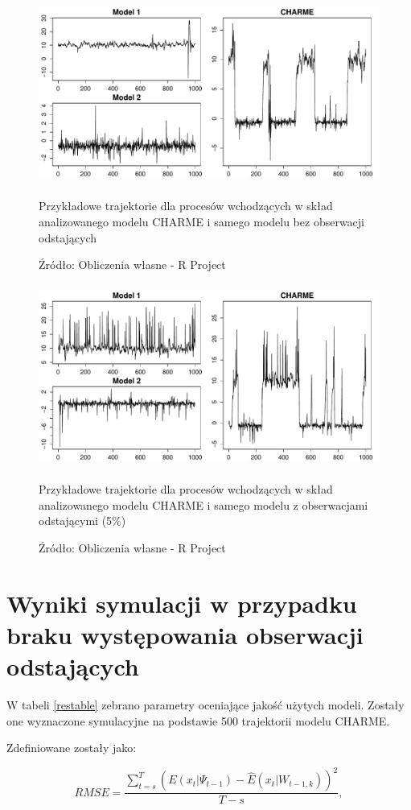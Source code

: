 \documentclass[man,mfu]{mgrwms}
\begin{document}
\begin{figure}[H]
\centering
\includegraphics[width=160mm,height = 60mm]{simex}
\caption{Przykładowe trajektorie dla procesów wchodzących w skład analizowanego modelu CHARME i samego modelu bez obserwacji odstających}
\caption*{Źródło: Obliczenia własne - R Project}
\label{fig:simex}
\end{figure}

\begin{figure}[H]
\centering
\includegraphics[width=160mm,height = 60mm]{simexout}
\caption{Przykładowe trajektorie dla procesów wchodzących w skład analizowanego modelu CHARME i samego modelu z obserwacjami odstającymi (5\%)}
\caption*{Źródło: Obliczenia własne - R Project}
\label{fig:simexout}
\end{figure}


\section{Wyniki symulacji w przypadku braku występowania obserwacji odstających}

W tabeli \ref{restable} zebrano parametry oceniające jakość użytych modeli. Zostały one wyznaczone symulacyjne na podstawie 500 trajektorii modelu CHARME.

Zdefiniowane zostały jako: 

\begin{equation}
RMSE = \frac{\sum_{t=s}^{T}({E}(x_{t}|\Psi_{t-1})-\hat{E}(x_{t}|W_{t-1,k}))^2}{T-s},
\end{equation}
\end{document}
